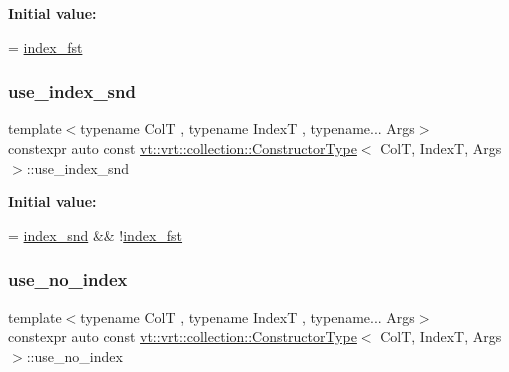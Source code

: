 {\bfseries Initial value\+:}
\begin{DoxyCode}
=
    \hyperlink{structvt_1_1vrt_1_1collection_1_1_constructor_type_a7ce20228ab2e310eb2e5217652af1741}{index\_fst}
\end{DoxyCode}
\mbox{\label{structvt_1_1vrt_1_1collection_1_1_constructor_type_aa9078dbcceaf5bb8a04966d07b0e2b71}} 
\subsubsection{\texorpdfstring{use\+\_\+index\+\_\+snd}{use\_index\_snd}}
{\footnotesize\ttfamily template$<$typename ColT , typename IndexT , typename... Args$>$ \\
constexpr auto const \hyperlink{structvt_1_1vrt_1_1collection_1_1_constructor_type}{vt\+::vrt\+::collection\+::\+Constructor\+Type}$<$ ColT, IndexT, Args $>$\+::use\+\_\+index\+\_\+snd\hspace{0.3cm}{\ttfamily [static]}}

{\bfseries Initial value\+:}
\begin{DoxyCode}
=
    \hyperlink{structvt_1_1vrt_1_1collection_1_1_constructor_type_a8dc80a798ad30e23016abddd56077be5}{index\_snd} && !\hyperlink{structvt_1_1vrt_1_1collection_1_1_constructor_type_a7ce20228ab2e310eb2e5217652af1741}{index\_fst}
\end{DoxyCode}
\mbox{\label{structvt_1_1vrt_1_1collection_1_1_constructor_type_af87163cdd43c8ef39edcaf894c9d6386}} 
\subsubsection{\texorpdfstring{use\+\_\+no\+\_\+index}{use\_no\_index}}
{\footnotesize\ttfamily template$<$typename ColT , typename IndexT , typename... Args$>$ \\
constexpr auto const \hyperlink{structvt_1_1vrt_1_1collection_1_1_constructor_type}{vt\+::vrt\+::collection\+::\+Constructor\+Type}$<$ ColT, IndexT, Args $>$\+::use\+\_\+no\+\_\+index\hspace{0.3cm}{\ttfamily [static]}}

